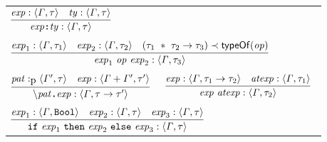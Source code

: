 \documentclass[final]{article}
\begin{document}
\begin{figure}[t]
\begin{small}
\begin{center}
  \begin{tabular}{llll}
    \multicolumn{4}{l}{
      $\MEMinferc
      {\MEMtyping{\CONStypexp{\METAexp}{\METAty}}{\METAityenv}{\METAity}}
      {\MEMtyping{\METAexp}{\METAityenv}{\METAity}}
      {\MEMtyping{\METAty}{\METAityenv}{\METAity}}$
    }

    \\
    &&&
    \\

    \multicolumn{4}{l}{
      $\MEMinferd
      {\MEMtyping{\CONSopexp{\METAexp_1}{\METAop}{\METAexp_2}}{\METAityenv}{\METAity_3}}
      {\MEMtyping{\METAexp_1}{\METAityenv}{\METAity_1}}
      {\MEMtyping{\METAexp_2}{\METAityenv}{\METAity_2}}
      {\MEMinstance{(\CONSarrowty{\CONStupty{\METAity_1}{\METAity_2}}{\METAity_3})}{\MEMtypeofop{\METAop}}}$
    }

    \\
    &&&
    \\



    \multicolumn{2}{l}{
      $\MEMinferc
      {\MEMtyping{\CONSlamexp{\METApat}{\METAexp}}{\METAityenv}{\CONSarrowty{\METAity}{\METAity'}}}
      {\MEMtypingpat{\METApat}{\METAityenv'}{\METAity}}
      {\MEMtyping{\METAexp}{\MEMplusenv{\METAityenv}{\METAityenv'}}{\METAity'}}$
    }

    &

    \multicolumn{2}{l}{
      $\MEMinferc
      {\MEMtyping{\CONSappexp{\METAexp}{\METAatexp}}{\METAityenv}{\METAity_2}}
      {\MEMtyping{\METAexp}{\METAityenv}{\CONSarrowty{\METAity_1}{\METAity_2}}}
      {\MEMtyping{\METAatexp}{\METAityenv}{\METAity_1}}$
    }



    \\
    &&&
    \\

    \multicolumn{4}{l}{
      $\MEMinferd
      {\MEMtyping{\CONSiteexp{\METAexp_1}{\METAexp_2}{\METAexp_3}}{\METAityenv}{\METAity}}
      {\MEMtyping{\METAexp_1}{\METAityenv}{\CONSboolty}}
      {\MEMtyping{\METAexp_2}{\METAityenv}{\METAity}}
      {\MEMtyping{\METAexp_3}{\METAityenv}{\METAity}}$
    }


\end{tabular}
\end{center}
\end{small}
\end{figure}
\end{document}
